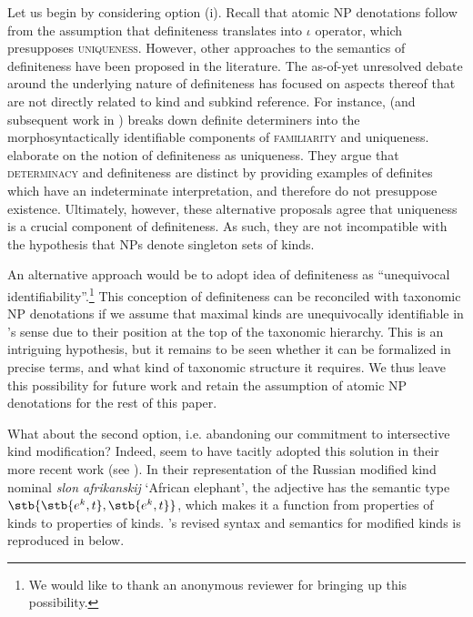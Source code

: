 \documentclass[output=paper,
colorlinks,
citecolor=brown,
newtxmath
]{langscibook}
\begin{document}
Let us begin by considering option (i). Recall that atomic NP denotations follow from the assumption that definiteness translates into  $\iota$ operator, which presupposes \textsc{uniqueness}. However, other approaches to the semantics of definiteness have been proposed in the literature. The as-of-yet unresolved debate around the underlying nature of definiteness has focused on aspects thereof that are not directly related to kind and subkind reference. For instance, \citet{Schwarz2009} (and subsequent work in \citealt{Schwarz2013}) breaks down definite determiners into the morphosyntactically identifiable components of \textsc{familiarity} and uniqueness. \citet{Coppock.Beaver2014,Coppock.Beaver2015} elaborate on the notion of definiteness as uniqueness. They argue that \textsc{determinacy} and definiteness are distinct by providing examples of definites which have an indeterminate interpretation, and therefore do not presuppose existence. Ultimately, however, these alternative proposals agree that uniqueness is a crucial component of definiteness. As such, they are not incompatible with the hypothesis that NPs denote singleton sets of kinds.

An alternative approach would be to adopt  idea of definiteness as ``unequivocal identifiability''.\footnote{We would like to thank an anonymous reviewer for bringing up this possibility.} This conception of definiteness can be reconciled with taxonomic NP denotations if we assume that maximal kinds are unequivocally identifiable in \citeauthor{Lobner1985}'s sense due to their position at the top of the taxonomic hierarchy. This is an intriguing hypothesis, but it remains to be seen whether it can be formalized in precise terms, and what kind of taxonomic structure it requires. We thus leave this possibility for future work and retain the assumption of atomic NP denotations for the rest of this paper.

What about the second option, i.e. abandoning our commitment to intersective kind modification? Indeed, \citeauthor{Borik.Espinal2012} seem to have tacitly adopted this solution in their more recent work (see \citealt{Borik.Espinal2016, Borik.Espinal2018}). In their representation of the Russian modified kind nominal \textit{slon afrikanskij} `African elephant', the adjective has the semantic type $\stb{\stb{e^k,t},\stb{e^k,t}}$, which makes it a function from properties of kinds to properties of kinds. \citeauthor{Borik.Espinal2012}'s revised syntax and semantics for modified kinds is reproduced in  below.
\end{document}
